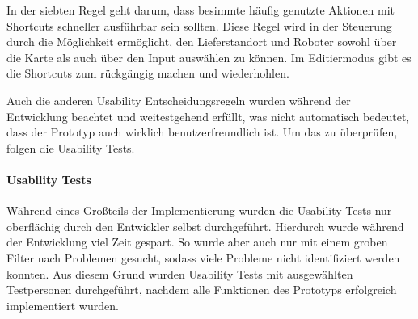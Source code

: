 In der siebten Regel geht darum, dass besimmte häufig genutzte Aktionen mit Shortcuts schneller ausführbar sein sollten. Diese Regel wird in der Steuerung durch die Möglichkeit ermöglicht, den Lieferstandort und Roboter sowohl über die Karte als auch über den Input auswählen zu können. Im Editiermodus gibt es die Shortcuts zum rückgängig machen und wiederhohlen.




Auch die anderen Usability Entscheidungsregeln wurden während der Entwicklung beachtet und weitestgehend erfüllt, was nicht automatisch bedeutet, dass der Prototyp auch wirklich benutzerfreundlich ist. Um das zu überprüfen, folgen die Usability Tests.

\paragraph{Usability Tests}
Während eines Großteils der Implementierung wurden die Usability Tests nur oberflächig durch den Entwickler selbst durchgeführt. Hierdurch wurde während der Entwicklung viel Zeit gespart. So wurde aber auch nur mit einem groben Filter nach Problemen gesucht, sodass viele Probleme nicht identifiziert werden konnten. Aus diesem Grund wurden Usability Tests mit ausgewählten Testpersonen durchgeführt, nachdem alle Funktionen des Prototyps erfolgreich implementiert wurden.

